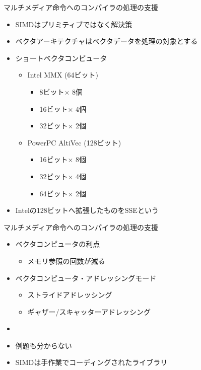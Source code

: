\documentclass[dvipdfmx]{beamer}
\begin{document}
	\begin{frame}{マルチメディア命令へのコンパイラの処理の支援}
		\begin{itemize}
			\item SIMDはプリミティブではなく解決策
			\item ベクタアーキテクチャはベクタデータを処理の対象とする
			\item ショートベクタコンピュータ
				\begin{itemize}
					\item Intel MMX (64ビット)
						\begin{itemize}
							\item 8ビット$\times$ 8個
							\item 16ビット$\times$ 4個
							\item 32ビット$\times$ 2個
						\end{itemize}
					\item PowerPC AltiVec (128ビット)
						\begin{itemize}
							\item 16ビット$\times$ 8個
							\item 32ビット$\times$ 4個
							\item 64ビット$\times$ 2個
						\end{itemize}
				\end{itemize}
			\item Intelの128ビットへ拡張したものをSSEという
		\end{itemize}
	\end{frame}

	\begin{frame}{マルチメディア命令へのコンパイラの処理の支援}
		\begin{itemize}
			\item ベクタコンピュータの利点
				\begin{itemize}
					\item メモリ参照の回数が減る
				\end{itemize}
			\item ベクタコンピュータ・アドレッシングモード
				\begin{itemize}
					\item ストライドアドレッシング
					\item ギャザー/スキャッターアドレッシング
				\end{itemize}
			\item {}
			\item 例題も分からない
			\item SIMDは手作業でコーディングされたライブラリ
		\end{itemize}
	\end{frame}
\end{document}
